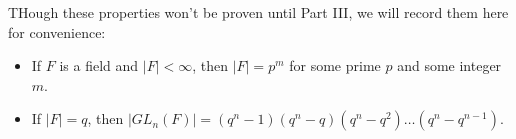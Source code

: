 \documentclass[12pt]{article}
\begin{document}
    THough these properties won't be proven until Part III,
    we will record them here for convenience:
    \begin{itemize}[label=$\diamond$]
        \item 
            If $F$ is a field and $|F| < \infty$,
            then $|F| = p^m$ for some prime $p$
            and some integer $m$.
        \item 
            If $|F| = q$, then
            $|GL_n(F)| = (q^n - 1)(q^n - q)(q^n - q^2)\dots(q^n-q^{n-1})$.
    \end{itemize}
    
\end{document}

